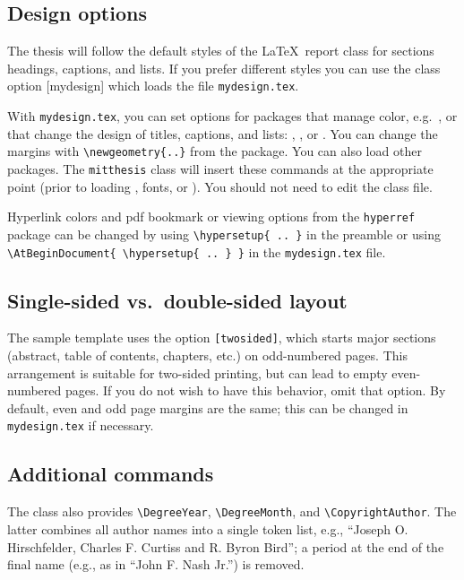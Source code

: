 \documentclass[11pt]{article}
\begin{document}
\subsection{Design options}
The thesis will follow the default styles of the \LaTeX\ report class for sections headings, captions, and lists.  If you prefer different styles you can use the class option [mydesign] which loads the file \texttt{mydesign.tex}.  

With \texttt{mydesign.tex}, you can set options for packages that manage color, e.g.\ \texttt{}, or that change the design of titles, captions, and lists: \texttt{}, \texttt{}, or \texttt{}. You can change the margins with \verb|\newgeometry{..}| from the \texttt{} package. You can also load other packages.  The \texttt{mitthesis} class will insert these commands at the appropriate point (prior to loading  \texttt{}, fonts, or  \texttt{}).  You should not need to edit the class file.

Hyperlink colors and pdf bookmark or viewing options from the \texttt{hyperref} package can be changed by using \verb|\hypersetup{ .. }| in the preamble or using \verb|\AtBeginDocument{ \hypersetup{ .. } }| in the \texttt{mydesign.tex} file.

\subsection{Single-sided vs.\ double-sided layout}
The sample template uses the option \texttt{[twosided]}, which starts major sections (abstract, table of contents, chapters, etc.) on odd-numbered pages.  This arrangement is suitable for two-sided printing, but can lead to empty even-numbered pages. If you do not wish to have this behavior, omit that option.  By default, even and odd page margins are the same; this can be changed in \texttt{mydesign.tex} if necessary.

\subsection{Additional commands}
The class also provides \verb|\DegreeYear|, \verb|\DegreeMonth|, and \verb|\CopyrightAuthor|. The latter combines all author names into a single token list, e.g., ``Joseph O. Hirschfelder, Charles F. Curtiss and R. Byron Bird''; a period at the end of the final name (e.g., as in ``John F. Nash Jr.'') is removed.
\end{document}
